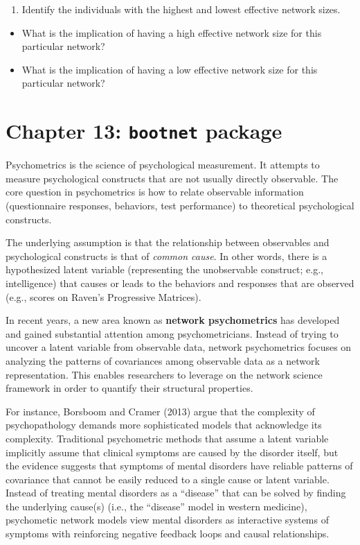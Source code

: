 \documentclass[
]{book}
\providecommand{\tightlist}{%
  \setlength{\itemsep}{0pt}\setlength{\parskip}{0pt}}
\begin{document}
\begin{enumerate}
\def\labelenumi{\arabic{enumi}.}
\setcounter{enumi}{1}
\tightlist
\item
  Identify the individuals with the highest and lowest effective network sizes.
\end{enumerate}

\begin{itemize}
\tightlist
\item
  What is the implication of having a high effective network size for this particular network?
\item
  What is the implication of having a low effective network size for this particular network?
\end{itemize}

\chapter{\texorpdfstring{Chapter 13: \texttt{bootnet} package}{Chapter 13: bootnet package}}\label{ch13}

Psychometrics is the science of psychological measurement. It attempts to measure psychological constructs that are not usually directly observable. The core question in psychometrics is how to relate observable information (questionnaire responses, behaviors, test performance) to theoretical psychological constructs.

The underlying assumption is that the relationship between observables and psychological constructs is that of \emph{common cause}. In other words, there is a hypothesized latent variable (representing the unobservable construct; e.g., intelligence) that causes or leads to the behaviors and responses that are observed (e.g., scores on Raven's Progressive Matrices).

In recent years, a new area known as \textbf{network psychometrics} has developed and gained substantial attention among psychometricians. Instead of trying to uncover a latent variable from observable data, network psychometrics focuses on analyzing the patterns of covariances among observable data as a network representation. This enables researchers to leverage on the network science framework in order to quantify their structural properties.

For instance, Borsboom and Cramer (2013) argue that the complexity of psychopathology demands more sophisticated models that acknowledge its complexity. Traditional psychometric methods that assume a latent variable implicitly assume that clinical symptoms are caused by the disorder itself, but the evidence suggests that symptoms of mental disorders have reliable patterns of covariance that cannot be easily reduced to a single cause or latent variable. Instead of treating mental disorders as a ``disease'' that can be solved by finding the underlying cause(s) (i.e., the ``disease'' model in western medicine), psychometic network models view mental disorders as interactive systems of symptoms with reinforcing negative feedback loops and causal relationships.
\end{document}
